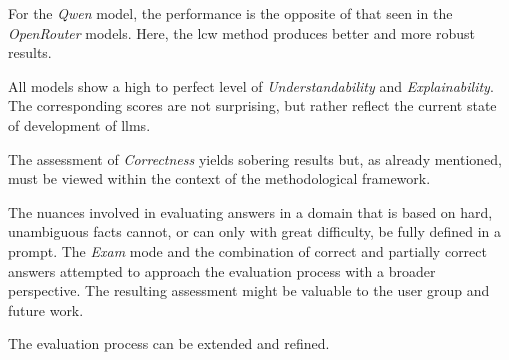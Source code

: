 For the \textit{Qwen} model, the performance is the opposite of that seen in the \textit{OpenRouter} models. 
Here, the \ac{lcw} method produces better and more robust results.

All models show a high to perfect level of \textit{Understandability} and \textit{Explainability}.
The corresponding scores are not surprising, but rather reflect the current state of development of \acp{llm}.

The assessment of \textit{Correctness} yields sobering results but, as already mentioned, must be viewed within the context of the methodological framework.

The nuances involved in evaluating answers in a domain that is based on hard, unambiguous facts cannot, or can only with great difficulty, be fully defined in a prompt.
The \textit{Exam} mode and the combination of correct and partially correct answers attempted to approach the evaluation process with a broader perspective.
The resulting assessment might be valuable to the user group and future work.

The evaluation process can be extended and refined.
